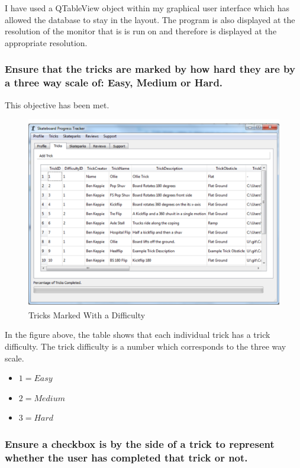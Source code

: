 I have used a QTableView object within my graphical user interface which has allowed the database to stay in the layout. The program is also displayed at the resolution of the monitor that is is run on and therefore is displayed at the appropriate resolution.

\subsubsection {Ensure that the tricks are marked by how hard they are by a three way scale of: Easy, Medium or Hard.}

This objective has been met.

\begin{figure}[H]
    \includegraphics[width=\textwidth]{./Evaluation/images/TricksTableNFS.pdf}
    \caption{Tricks Marked With a Difficulty} \label{fig:TricksTableDiff}
\end{figure}

In the figure above, the table shows that each individual trick has a trick difficulty. The trick difficulty is a number which corresponds to the three way scale.

\begin{itemize}
\item $1 = Easy$
\item $2 = Medium$
\item $3 = Hard$
\end{itemize}


\subsubsection {Ensure a checkbox is by the side of a trick to represent whether the user has completed that trick or not.}

